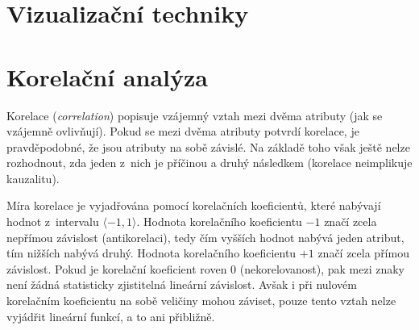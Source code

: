 
\section{Vizualizační techniky}



\section{Korelační analýza}

\begin{compactitem}
    \item Korelace (\textit{correlation}) popisuje vzájemný vztah mezi dvěma atributy (jak se vzájemně ovlivňují). Pokud se mezi dvěma atributy potvrdí korelace, je pravděpodobné, že jsou atributy na sobě závislé. Na základě toho však ještě nelze rozhodnout, zda jeden z~nich je příčinou a druhý následkem (korelace neimplikuje kauzalitu).

    \item Míra korelace je vyjadřována pomocí korelačních koeficientů, které nabývají hodnot z~intervalu $\langle-1,1\rangle$. Hodnota korelačního koeficientu $-1$ značí zcela nepřímou závislost (antikorelaci), tedy čím vyšších hodnot nabývá jeden atribut, tím nižších nabývá druhý. Hodnota korelačního koeficientu $+1$ značí zcela přímou závislost. Pokud je korelační koeficient roven 0 (nekorelovanost), pak mezi znaky není žádná statisticky zjistitelná lineární závislost. Avšak i při nulovém korelačním koeficientu na sobě veličiny mohou záviset, pouze tento vztah nelze vyjádřit lineární funkcí, a to ani přibližně.
\end{compactitem}
